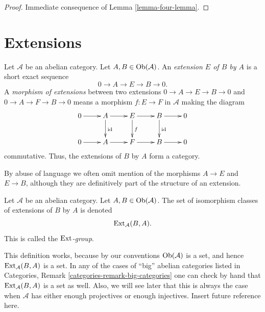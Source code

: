 \begin{proof}
Immediate consequence of
Lemma \ref{lemma-four-lemma}.
\end{proof}








\section{Extensions}
\label{section-extensions}

\begin{definition}
\label{definition-extension}
Let $\mathcal{A}$ be an abelian category.
Let $A, B \in \mathop{\mathrm{Ob}}\nolimits(\mathcal{A})$.
An {\it extension $E$ of $B$ by $A$} is a short
exact sequence
$$
0 \to A \to E \to B \to 0.
$$
A {\it morphism of extensions} between two
extensions $0 \to A \to E \to B \to 0$ and
$0 \to A \to F \to B \to 0$ means a morphism
$f : E \to F$ in $\mathcal{A}$ making the diagram
$$
\xymatrix{
0 \ar[r] &
A \ar[r] \ar[d]^{\text{id}} &
E \ar[r] \ar[d]^f &
B \ar[r] \ar[d]^{\text{id}} &
0 \\
0 \ar[r] &
A \ar[r] &
F \ar[r] &
B \ar[r] &
0
}
$$
commutative.
Thus, the extensions of $B$ by $A$ form a category.
\end{definition}

\noindent
By abuse of language we often omit mention of the
morphisms $A \to E$ and $E \to B$, although they are
definitively part of the structure of an extension.

\begin{definition}
\label{definition-ext-group}
Let $\mathcal{A}$ be an abelian category.
Let $A, B \in \mathop{\mathrm{Ob}}\nolimits(\mathcal{A})$.
The set of isomorphism classes of extensions
of $B$ by $A$ is denoted
$$
\mathop{\mathrm{Ext}}\nolimits_\mathcal{A}(B, A).
$$
This is called the {\it $\mathop{\mathrm{Ext}}\nolimits$-group}.
\end{definition}

\noindent
This definition works, because by our conventions
$\mathop{\mathrm{Ob}}\nolimits(\mathcal{A})$ is a set, and hence
$\mathop{\mathrm{Ext}}\nolimits_\mathcal{A}(B, A)$ is a set.
In any of the cases of ``big'' abelian categories
listed in Categories, Remark \ref{categories-remark-big-categories}
one can check by hand that $\mathop{\mathrm{Ext}}\nolimits_\mathcal{A}(B, A)$
is a set as well. Also, we will see later that this is
always the case when $\mathcal{A}$ has either enough projectives
or enough injectives. Insert future reference here.

